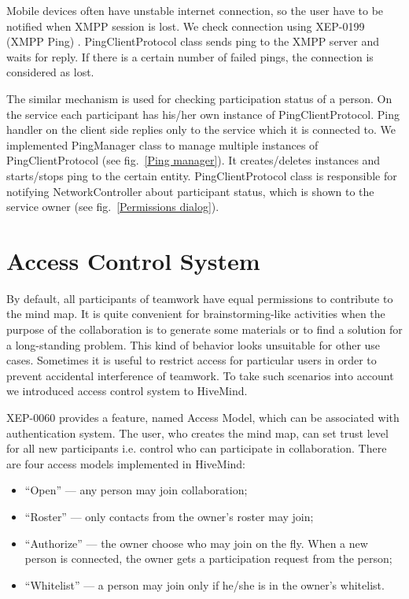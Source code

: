 Mobile devices often have unstable internet connection, so the user have to be
notified when XMPP session is lost. We check connection using XEP-0199 (XMPP
Ping) \cite{ping-xep-0199}. PingClientProtocol class sends ping to the XMPP
server and waits for reply. If there is a certain number of failed pings, the
connection is considered as lost.

The similar mechanism is used for checking participation status of a person. On
the service each participant has his/her own instance of PingClientProtocol. Ping
handler on the client side replies only to the service which it is connected
to. We implemented PingManager class to manage multiple instances of
PingClientProtocol (see fig.~\ref{Ping manager}).  It creates/deletes instances
and starts/stops ping to the certain entity. PingClientProtocol class is
responsible for notifying NetworkController about participant status, which is
shown to the service owner (see fig.~\ref{Permissions dialog}).

\section{Access Control System}
\label{Access control system}

By default, all participants of teamwork have equal permissions to contribute to
the mind map. It is quite convenient for brainstorming-like activities when the
purpose of the collaboration is to generate some materials or to find a solution
for a long-standing problem. This kind of behavior looks unsuitable for other
use cases. Sometimes it is useful to restrict access for particular users in
order to prevent accidental interference of teamwork. To take such scenarios
into account we introduced access control system to HiveMind.

XEP-0060 provides a feature, named Access Model, which can be associated with
authentication system. The user, who creates the mind map, can set trust level
for all new participants i.e. control who can participate in collaboration.
There are four access models implemented in HiveMind:
\begin{itemize}
\item ``Open'' --- any person may join collaboration;
\item ``Roster'' --- only contacts from the owner’s roster may join;
\item ``Authorize'' --- the owner choose who may join on the fly. When a new
  person is connected, the owner gets a participation request from the person;
\item ``Whitelist'' --- a person may join only if he/she is in the owner’s
  whitelist.
\end{itemize}

